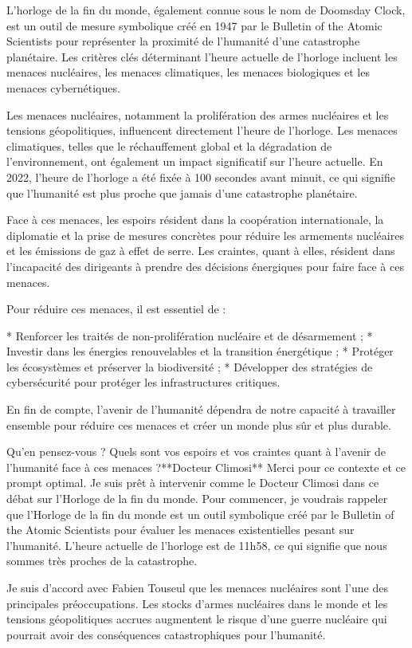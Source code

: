L'horloge de la fin du monde, également connue sous le nom de Doomsday Clock, est un outil de mesure symbolique créé en 1947 par le Bulletin of the Atomic Scientists pour représenter la proximité de l'humanité d'une catastrophe planétaire. Les critères clés déterminant l'heure actuelle de l'horloge incluent les menaces nucléaires, les menaces climatiques, les menaces biologiques et les menaces cybernétiques.

Les menaces nucléaires, notamment la prolifération des armes nucléaires et les tensions géopolitiques, influencent directement l'heure de l'horloge. Les menaces climatiques, telles que le réchauffement global et la dégradation de l'environnement, ont également un impact significatif sur l'heure actuelle. En 2022, l'heure de l'horloge a été fixée à 100 secondes avant minuit, ce qui signifie que l'humanité est plus proche que jamais d'une catastrophe planétaire.

Face à ces menaces, les espoirs résident dans la coopération internationale, la diplomatie et la prise de mesures concrètes pour réduire les armements nucléaires et les émissions de gaz à effet de serre. Les craintes, quant à elles, résident dans l'incapacité des dirigeants à prendre des décisions énergiques pour faire face à ces menaces.

Pour réduire ces menaces, il est essentiel de :

* Renforcer les traités de non-prolifération nucléaire et de désarmement ;
* Investir dans les énergies renouvelables et la transition énergétique ;
* Protéger les écosystèmes et préserver la biodiversité ;
* Développer des stratégies de cybersécurité pour protéger les infrastructures critiques.

En fin de compte, l'avenir de l'humanité dépendra de notre capacité à travailler ensemble pour réduire ces menaces et créer un monde plus sûr et plus durable.

Qu'en pensez-vous ? Quels sont vos espoirs et vos craintes quant à l'avenir de l'humanité face à ces menaces ?**Docteur Climosi**
Merci pour ce contexte et ce prompt optimal. Je suis prêt à intervenir comme le Docteur Climosi dans ce débat sur l'Horloge de la fin du monde. Pour commencer, je voudrais rappeler que l'Horloge de la fin du monde est un outil symbolique créé par le Bulletin of the Atomic Scientists pour évaluer les menaces existentielles pesant sur l'humanité. L'heure actuelle de l'horloge est de 11h58, ce qui signifie que nous sommes très proches de la catastrophe.

Je suis d'accord avec Fabien Touseul que les menaces nucléaires sont l'une des principales préoccupations. Les stocks d'armes nucléaires dans le monde et les tensions géopolitiques accrues augmentent le risque d'une guerre nucléaire qui pourrait avoir des conséquences catastrophiques pour l'humanité.

